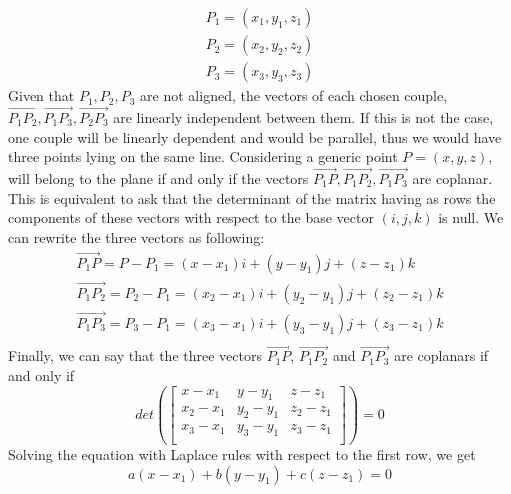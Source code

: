 \begin{equation}
    \begin{gathered}
        P_1 = (x_1, y_1, z_1) \\
        P_2 = (x_2, y_2, z_2) \\
        P_3 = (x_3, y_3, z_3)
    \end{gathered}
\end{equation}
Given that $P_1, P_2, P_3$ are not aligned, the vectors of each chosen couple, $\overrightarrow{P_1P_2}, \overrightarrow{P_1P_3}, \overrightarrow{P_2P_3}$ are linearly independent between them. If this is not the case, one couple will be linearly dependent and would be parallel, thus we would have three points lying on the same line. \newline
Considering a generic point $P = (x, y, z)$, will belong to the plane if and only if the vectors $\overrightarrow{P_1P}, \overrightarrow{P_1P_2}, \overrightarrow{P_1P_3}$ are coplanar. This is equivalent to ask that the determinant of the matrix having as rows the components of these vectors with respect to the base vector $(i, j, k)$ is null. \newline
We can rewrite the three vectors as following:
\begin{equation}
    \begin{gathered}
        \overrightarrow{P_1P} = P - P_1 = (x-x_1)i + (y-y_1)j + (z-z_1)k \\
        \overrightarrow{P_1P_2} = P_2 - P_1 = (x_2-x_1)i + (y_2-y_1)j + (z_2-z_1)k \\
        \overrightarrow{P_1P_3} = P_3 - P_1 = (x_3-x_1)i + (y_3-y_1)j + (z_3-z_1)k \\
    \end{gathered}
\end{equation}
Finally, we can say that the three vectors $\overrightarrow{P_1P}$, $\overrightarrow{P_1P_2}$ and $\overrightarrow{P_1P_3}$ are coplanars if and only if 
\begin{equation}
    det \left (\begin{bmatrix}
        x - x_1 & y - y_1 & z - z_1 \\
        x_2 - x_1 & y_2 - y_1 & z_2 - z_1 \\
        x_3 - x_1 & y_3 - y_1 & z_3 - z_1 \\
    \end{bmatrix} \right ) = 0
\end{equation}
Solving the equation with Laplace rules with respect to the first row, we get
\begin{equation}
    \label{eq:plane_estim}
    a(x - x_1) + b(y - y_1) + c(z - z_1) = 0
\end{equation}
